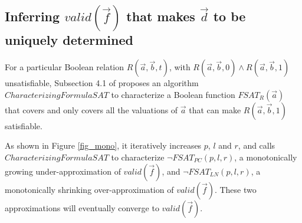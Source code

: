 \documentclass[conference]{IEEEtran}
\begin{document}



\subsection{Inferring $valid(\vec{f})$ that makes $\vec{d}$ to be uniquely determined}\label{subsec_infer}



For a particular Boolean relation $R(\vec{a},\vec{b},t)$, 
with $R(\vec{a},\vec{b},0)\wedge R(\vec{a},\vec{b},1)$ unsatisfiable,
Subsection 4.1 of \cite{QinTODAES15} proposes an algorithm $CharacterizingFormulaSAT$
to characterize a Boolean function $FSAT_R(\vec{a})$
that covers and only covers all the valuations of $\vec{a}$ 
that can make $R(\vec{a},\vec{b},1)$ satisfiable.

As shown in Figure \ref{fig_mono},
it iteratively increases $p$, $l$ and $r$,
and calls $CharacterizingFormulaSAT$ to characterize $\neg FSAT_{PC}(p,l,r)$,
a monotonically growing under-approximation of $valid(\vec{f})$,
and $\neg FSAT_{LN}(p,l,r)$,
a monotonically shrinking over-approximation of $valid(\vec{f})$.
These two approximations will eventually converge to $valid(\vec{f})$.
\end{document}
